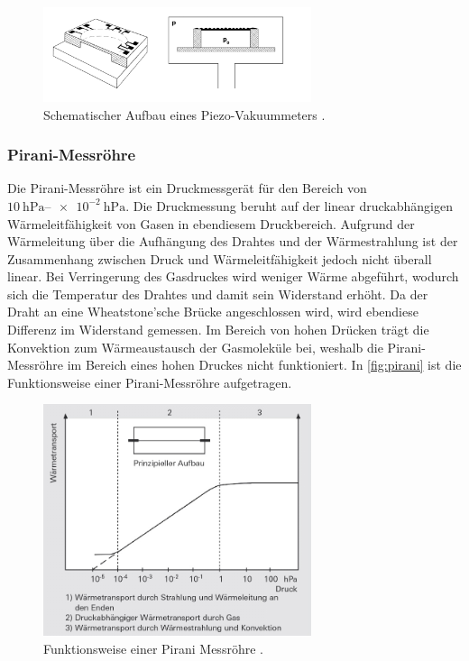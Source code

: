 \begin{figure}[H]
    \centering
    \includegraphics[width=0.7\textwidth]{data/piezo-vakuummeter.jpg}
    \caption{Schematischer Aufbau eines Piezo-Vakuummeters \cite{Druckmessung}.}
    \label{fig:piezo}
\end{figure}


\subsubsection{Pirani-Messröhre}
\label{subsubsec:pirani}

Die Pirani-Messröhre ist ein Druckmessgerät für den Bereich von $\SIrange{10}{e-2}{\hecto\pascal}$. Die Druckmessung beruht auf der linear druckabhängigen Wärmeleitfähigkeit von Gasen in ebendiesem Druckbereich. Aufgrund der Wärmeleitung über die Aufhängung des Drahtes und der Wärmestrahlung ist der Zusammenhang zwischen 
Druck und Wärmeleitfähigkeit jedoch nicht überall linear. Bei Verringerung des Gasdruckes wird weniger Wärme abgeführt, wodurch sich die Temperatur des Drahtes und damit sein Widerstand erhöht. 
Da der Draht an eine Wheatstone'sche Brücke angeschlossen wird, wird ebendiese Differenz im Widerstand gemessen. \newline
Im Bereich von hohen Drücken trägt die Konvektion zum Wärmeaustausch der Gasmoleküle bei, weshalb die Pirani-Messröhre im Bereich eines hohen Druckes nicht funktioniert. In \autoref{fig:pirani} ist die Funktionsweise einer Pirani-Messröhre aufgetragen.

\begin{figure}[H]
    \centering
    \includegraphics[width=0.7\textwidth]{data/pirani-messroehre.jpg}
    \caption{Funktionsweise einer Pirani Messröhre \cite{Totaldruckmessung}.}
    \label{fig:pirani}
\end{figure}

